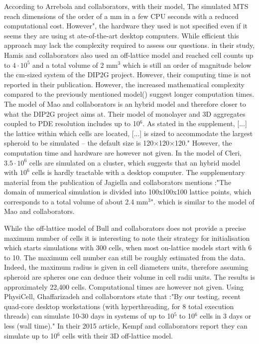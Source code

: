 \documentclass[11pt,a4paper]{article}
\begin{document}
According to Arrebola and collaborators, with their model, The simulated MTS reach dimensions of the order of a mm in a few CPU seconds with a reduced computational cost. However", the hardware they used is not specified even if it seems they are using st	ate-of-the-art desktop computers.\cite{Arrebola2020} While efficient this approach may lack the complexity required to assess our questions. in their study, Hamis and collaborators also used an off-lattice model and reached cell counts up to $4\cdot 10^{5}$ and a total volume of 2 mm$^{3}$ which is still an order of magnitude below the cm-sized system of the DIP2G project. However, their computing time is not reported in their publication.\cite{Hamis2020} However, the increased mathematical complexity compared to the previously mentioned model(\cite{Arrebola2020}) suggest longer computation times. The model of Mao and collaborators is an hybrid model and therefore closer to what the DIP2G project aims at. Their model of monolayer and 3D aggregates coupled to PDE resolution includes up to 10$^{6}$. As stated in the supplement, [...] the lattice within which cells are located, [...] is sized to accommodate the largest spheroid to be simulated – the default size is 120×120×120." However, the computation time and hardware are however not given.\cite{Mao2018} In the model of Cleri, $3.5 \cdot 10^{6}$ cells are simulated on a cluster, which suggests that an hybrid model with $10^{6}$ cells is hardly tractable with a desktop computer.\cite{Cleri2019} The supplementary material from the publication of Jagiella and collaborators mentions :"The domain of numerical simulation is divided into 100x100x100 lattice points, which corresponds to a total volume of about 2.4 mm$^{3}$". which is similar to the model of Mao and collaborators.

While the off-lattice model of Bull and collaborators does not provide a precise maximum number of cells it is interesting to note their strategy for initialisation which starts simulations with 300 cells, when most on-lattice models start with 6 to 10.\cite{Bull2020} The maximum cell number can still be roughly estimated from the data. Indeed, the maximum radius is given in cell diameters units, therefore assuming spheroid are spheres one can deduce their volume in cell radii units. The results is approximately 22,400 cells. Computational times are however not given. Using  PhysiCell,  Ghaffarizadeh and collaborators state that :"By our testing, recent quad-core desktop workstations (with hyperthreading, for 8 total execution threads) can simulate 10-30 days in systems of up to 10$^5$ to 10$^6$ cells in 3 days or less (wall time)." \cite{Ghaffarizadeh2017} In their 2015 article, Kempf and collaborators report they can simulate up to 10$^6$ cells with their 3D off-lattice model.\cite{Kempf2015} 
\end{document}
